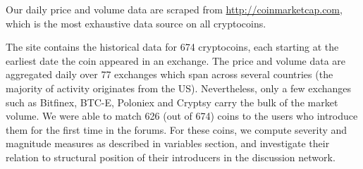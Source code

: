 Our daily price and volume data are scraped from \url{http://coinmarketcap.com}, which is the most exhaustive data source on all cryptocoins.

The site contains the historical data for 674 cryptocoins, each starting at the earliest date the coin appeared in an exchange.  The price and volume data are aggregated daily over 77 exchanges which span across several countries (the majority of activity originates from the US). Nevertheless, only a few exchanges such as Bitfinex, BTC-E, Poloniex and Cryptsy carry the bulk of the market volume. We were able to match 626 (out of 674) coins to the users who introduce them for the first time in the forums. For these coins, we compute severity and magnitude measures as described in variables section, and investigate their relation to structural position of their introducers in the discussion network. 
